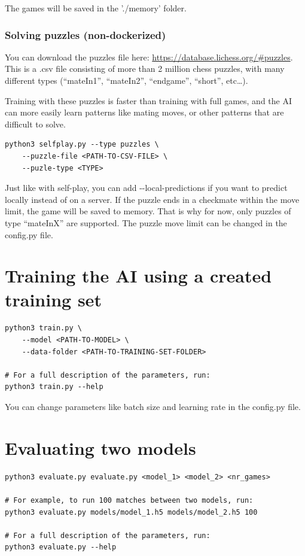 \documentclass{article}
\begin{document}
The games will be saved in the './memory' folder.

\subsubsection{Solving puzzles (non-dockerized)}

You can download the puzzles file here: \url{https://database.lichess.org/#puzzles}.
This is a .csv file consisting of more than 2 million chess puzzles, 
with many different types (``mateIn1'', ``mateIn2'', ``endgame'', ``short'', etc\dots).

Training with these puzzles is faster than training with full games, and the AI can
more easily learn patterns like mating moves, or other patterns that are difficult to solve. 

\begin{verbatim}
python3 selfplay.py --type puzzles \
    --puzzle-file <PATH-TO-CSV-FILE> \
    --puzle-type <TYPE>
\end{verbatim}

Just like with self-play, you can add -{}-local-predictions if you want to predict locally instead of on a server.
If the puzzle ends in a checkmate within the move limit, the game will be saved to memory. That is why for now, only puzzles of type ``mateInX'' are supported.
The puzzle move limit can be changed in the config.py file.

\section{Training the AI using a created training set}

\begin{verbatim}
python3 train.py \
    --model <PATH-TO-MODEL> \
    --data-folder <PATH-TO-TRAINING-SET-FOLDER>

# For a full description of the parameters, run:
python3 train.py --help
\end{verbatim}

You can change parameters like batch size and learning rate in the config.py file. 

\section{Evaluating two models}

\begin{verbatim}
python3 evaluate.py evaluate.py <model_1> <model_2> <nr_games>

# For example, to run 100 matches between two models, run:
python3 evaluate.py models/model_1.h5 models/model_2.h5 100

# For a full description of the parameters, run:
python3 evaluate.py --help
\end{verbatim}
\end{document}
